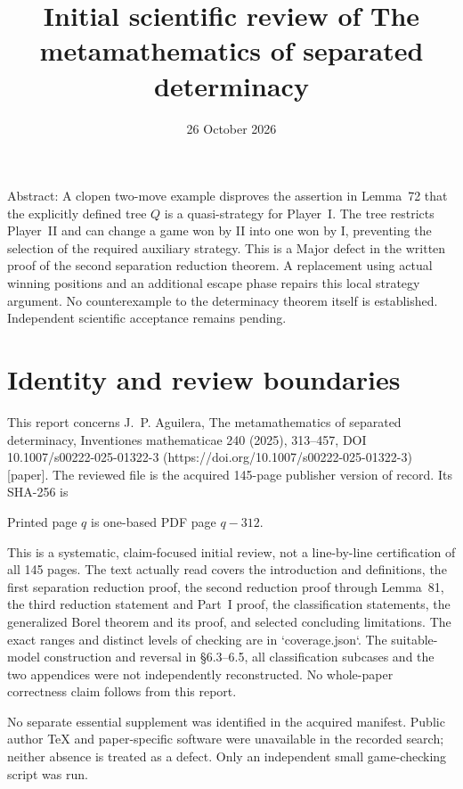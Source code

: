 \documentclass[10pt]{article}
\title{Initial scientific review of
The metamathematics of separated determinacy}
\author{}
\date{26 October 2026}
\begin{document}
\maketitle
Abstract: A clopen two-move example disproves the assertion in Lemma 72 that the explicitly defined tree \(Q\) is a quasi-strategy for Player I. The tree restricts Player II and can change a game won by II into one won by I, preventing the selection of the required auxiliary strategy. This is a Major defect in the written proof of the second separation reduction theorem. A replacement using actual winning positions and an additional escape phase repairs this local strategy argument. No counterexample to the determinacy theorem itself is established. Independent scientific acceptance remains pending.\par
\section*{Identity and review boundaries}
This report concerns J. P. Aguilera, The metamathematics of separated determinacy, Inventiones mathematicae 240 (2025), 313–457, DOI 10.1007/s00222-025-01322-3 (https://doi.org/10.1007/s00222-025-01322-3) [paper]. The reviewed file is the acquired 145-page publisher version of record. Its SHA-256 is\par
Printed page \(q\) is one-based PDF page \(q-312\).\par
This is a systematic, claim-focused initial review, not a line-by-line certification of all 145 pages. The text actually read covers the introduction and definitions, the first separation reduction proof, the second reduction proof through Lemma 81, the third reduction statement and Part I proof, the classification statements, the generalized Borel theorem and its proof, and selected concluding limitations. The exact ranges and distinct levels of checking are in `coverage.json`. The suitable-model construction and reversal in §6.3–6.5, all classification subcases and the two appendices were not independently reconstructed. No whole-paper correctness claim follows from this report.\par
No separate essential supplement was identified in the acquired manifest. Public author TeX and paper-specific software were unavailable in the recorded search; neither absence is treated as a defect. Only an independent small game-checking script was run.\par
\end{document}
